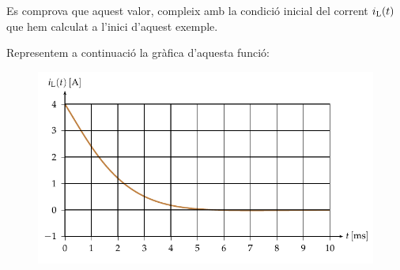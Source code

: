 \begin{exemple}
Es comprova que aquest valor, compleix amb la condici\'{o} inicial del
corrent $i_\mathrm{L}(t)$ que hem calculat a l'inici d'aquest exemple.

Representem a continuaci\'{o} la gr\`{a}fica d'aquesta funci\'{o}:
\begin{figure}[h]
\centering
  \includegraphics{Imatges/Cap-Laplace-Exemple3-Corrent.pdf}
\end{figure}

\end{exemple}

